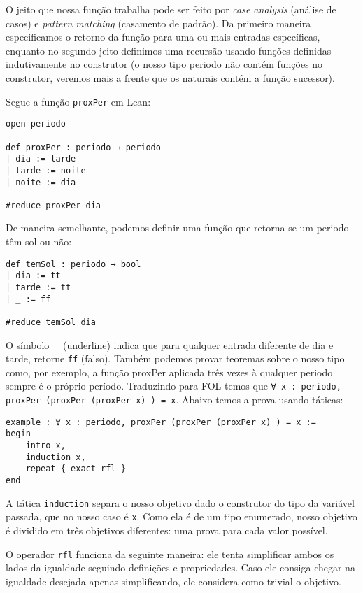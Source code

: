 O jeito que nossa função trabalha pode ser feito por \textit{case analysis} (análise de casos) e \textit{pattern matching} (casamento de padrão). Da primeiro maneira especificamos o retorno da função para uma ou mais entradas específicas, enquanto no segundo jeito definimos uma recursão usando funções definidas indutivamente no construtor (o nosso tipo periodo não contém funções no construtor, veremos mais a frente que os naturais contém a função sucessor).

Segue a função \lstinline{proxPer} em Lean:

\begin{lstlisting}
open periodo

def proxPer : periodo → periodo
| dia := tarde
| tarde := noite
| noite := dia

#reduce proxPer dia
\end{lstlisting}

De maneira semelhante, podemos definir uma função que retorna se um periodo têm sol ou não:

\begin{lstlisting}
def temSol : periodo → bool
| dia := tt
| tarde := tt
| _ := ff

#reduce temSol dia
\end{lstlisting}

O símbolo \_ (underline) indica que para qualquer entrada diferente de dia e tarde, retorne \lstinline{ff} (falso). Também podemos provar teoremas sobre o nosso tipo como, por exemplo, a função proxPer aplicada três vezes à qualquer periodo sempre é o próprio período. Traduzindo para FOL temos que \lstinline{∀ x : periodo, proxPer (proxPer (proxPer x) ) = x}. Abaixo temos a prova usando táticas:

\begin{lstlisting}
example : ∀ x : periodo, proxPer (proxPer (proxPer x) ) = x :=
begin
    intro x,
    induction x,
    repeat { exact rfl }
end
\end{lstlisting}

A tática \lstinline{induction} separa o nosso objetivo dado o construtor do tipo da variável passada, que no nosso caso é \lstinline{x}. Como ela é de um tipo enumerado, nosso objetivo é dividido em três objetivos diferentes: uma prova para cada valor possível.

O operador \lstinline{rfl} funciona da seguinte maneira: ele tenta simplificar ambos os lados da igualdade seguindo definições e propriedades. Caso ele consiga chegar na igualdade desejada apenas simplificando, ele considera como trivial o objetivo.

